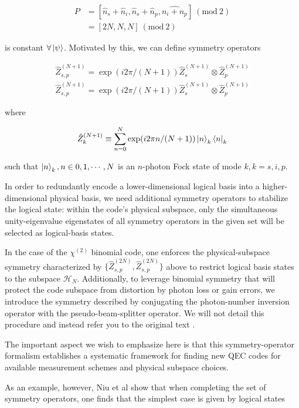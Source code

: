 \documentclass[12]{amsart}
\newcommand\0{\mathbf{0}}
\newcommand\<{\langle}
\renewcommand\>{\rangle}
\renewcommand\mod[1]{\ (\mathrm{mod}\ #1)}
\begin{document}
\begin{align*}
P &= [\hat{n}_s + \hat{n}_i, \hat{n}_s + \hat{n}_p, \hat{n_i + n_p}  ] \mod 2\\
&= [2N, N, N] \mod 2
\end{align*}

is constant $\forall \ket{\psi}$. Motivated by this, we can define symmetry operators 

\begin{align*}
\hat{Z}_{s, p}^{(N + 1)} = \exp(i 2 \pi / (N+1))	\hat{Z}_{s}^{(N + 1)} \otimes \hat{Z}_{p}^{(N + 1)} \\
\hat{Z}_{s, p}^{(N + 1)} = \exp(i 2 \pi / (N+1))	\hat{Z}_{s}^{(N + 1)} \otimes \hat{Z}_{p}^{(N + 1)}
\end{align*}

where

\begin{align*}
\hat{Z}_{k}^{(N + 1)} \equiv \sum_{n=0}^{N}\exp(i 2 \pi n / (N+1))	\ket{n}_k \bra{n}_k
\end{align*}

such that $\ket{n}_k, n \in 0, 1, \cdots, N$ is an $n$-photon Fock state of mode $k, k = s, i, p$.


In order to redundantly encode a lower-dimensional logical basis into a higher-dimensional physical basis, we need additional symmetry operators to stabilize the logical state: within the code’s physical subspace, only the simultaneous unity-eigenvalue eigenstates of all symmetry operators in the given set will be selected as logical-basis states.

In the case of the $\chi^{(2)}$ binomial code, one enforces the physical-subspace symmetry characterized by $\{ \hat{Z}_{s, p}^{(2N)}, \hat{Z}_{s, p}^{(2N)}\}$ above to restrict logical basis states to the subspace $\mathcal{H}_N$. Additionally, to leverage binomial symmetry that will protect the code subspace from distortion by photon loss or gain errors, we introduce the symmetry described by conjugating the photon-number inversion operator with the pseudo-beam-splitter operator. We will not detail this procedure and instead refer you to the original text \cite{niu2018hardware}.

The important aspect we wish to emphasize here is that this symmetry-operator formalism establishes a systematic framework for finding new QEC codes for available measurement schemes and physical subspace choices.

As an example, however, Niu et al show that when completing the set of symmetry operators, one finds that the simplest case is given by logical states
\end{document}
